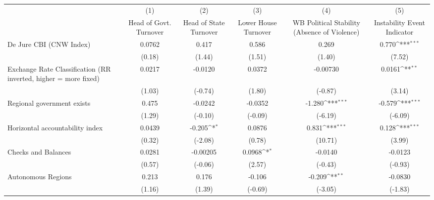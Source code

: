 {
\def\sym#1{\ifmmode^{#1}\else\(^{#1}\)\fi}
\begin{tabular*}{\linewidth}{@{\hskip\tabcolsep\extracolsep\fill}l*{5}{c}}
\toprule
                &\multicolumn{1}{c}{(1)}&\multicolumn{1}{c}{(2)}&\multicolumn{1}{c}{(3)}&\multicolumn{1}{c}{(4)}&\multicolumn{1}{c}{(5)}\\
                &\multicolumn{1}{c}{Head of Govt. Turnover}&\multicolumn{1}{c}{Head of State Turnover}&\multicolumn{1}{c}{Lower House Turnover}&\multicolumn{1}{c}{WB Political Stability (Absence of Violence)}&\multicolumn{1}{c}{Instability Event Indicator}\\
\midrule
De Jure CBI (CNW Index)&   0.0762         &    0.417         &    0.586         &    0.269         &    0.770\sym{***}\\
                &   (0.18)         &   (1.44)         &   (1.51)         &   (1.40)         &   (7.52)         \\
\addlinespace
Exchange Rate Classification (RR inverted, higher = more fixed)&   0.0217         &  -0.0120         &   0.0372         & -0.00730         &   0.0161\sym{**} \\
                &   (1.03)         &  (-0.74)         &   (1.80)         &  (-0.87)         &   (3.14)         \\
\addlinespace
Regional government exists   &    0.475         &  -0.0242         &  -0.0352         &   -1.280\sym{***}&   -0.579\sym{***}\\
                &   (1.29)         &  (-0.10)         &  (-0.09)         &  (-6.19)         &  (-6.09)         \\
\addlinespace
Horizontal accountability index&   0.0439         &   -0.205\sym{*}  &   0.0876         &    0.831\sym{***}&    0.128\sym{***}\\
                &   (0.32)         &  (-2.08)         &   (0.78)         &  (10.71)         &   (3.99)         \\
\addlinespace
Checks and Balances&   0.0281         & -0.00205         &   0.0968\sym{*}  &  -0.0140         &  -0.0123         \\
                &   (0.57)         &  (-0.06)         &   (2.57)         &  (-0.43)         &  (-0.93)         \\
\addlinespace
Autonomous Regions&    0.213         &    0.176         &   -0.106         &   -0.209\sym{**} &  -0.0830         \\
                &   (1.16)         &   (1.39)         &  (-0.69)         &  (-3.05)         &  (-1.83)         \\

\end{tabular*}}
